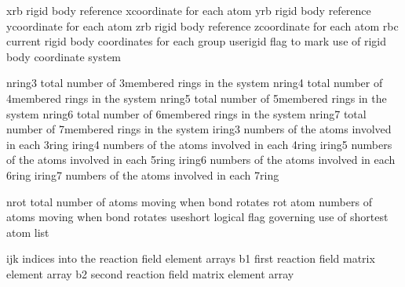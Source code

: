 \documentclass[letterpaper,11pt,english]{sphinxmanual}
\begin{document}
\sphinxAtStartPar
{}

\begin{sphinxVerbatim}[commandchars=\\\{\}]
xrb             rigid body reference x\PYGZhy{}coordinate for each atom
yrb             rigid body reference y\PYGZhy{}coordinate for each atom
zrb             rigid body reference z\PYGZhy{}coordinate for each atom
rbc             current rigid body coordinates for each group
use\PYGZus{}rigid       flag to mark use of rigid body coordinate system
\end{sphinxVerbatim}

\sphinxAtStartPar
{}

\begin{sphinxVerbatim}[commandchars=\\\{\}]
nring3          total number of 3\PYGZhy{}membered rings in the system
nring4          total number of 4\PYGZhy{}membered rings in the system
nring5          total number of 5\PYGZhy{}membered rings in the system
nring6          total number of 6\PYGZhy{}membered rings in the system
nring7          total number of 7\PYGZhy{}membered rings in the system
iring3          numbers of the atoms involved in each 3\PYGZhy{}ring
iring4          numbers of the atoms involved in each 4\PYGZhy{}ring
iring5          numbers of the atoms involved in each 5\PYGZhy{}ring
iring6          numbers of the atoms involved in each 6\PYGZhy{}ring
iring7          numbers of the atoms involved in each 7\PYGZhy{}ring
\end{sphinxVerbatim}

\sphinxAtStartPar
{}

\begin{sphinxVerbatim}[commandchars=\\\{\}]
nrot            total number of atoms moving when bond rotates
rot             atom numbers of atoms moving when bond rotates
use\PYGZus{}short       logical flag governing use of shortest atom list
\end{sphinxVerbatim}

\sphinxAtStartPar
{}

\begin{sphinxVerbatim}[commandchars=\\\{\}]
ijk             indices into the reaction field element arrays
b1              first reaction field matrix element array
b2              second reaction field matrix element array
\end{sphinxVerbatim}
\end{document}
